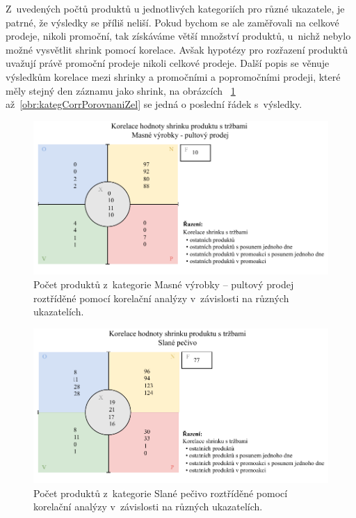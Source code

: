Z~uvedených počtů produktů u jednotlivých kategoriích pro různé ukazatele, je patrné, že výsledky se příliš neliší. Pokud bychom se ale zaměřovali na celkové prodeje, nikoli promoční, tak získáváme větší množství produktů, u~nichž nebylo možné vysvětlit shrink pomocí korelace. Avšak hypotézy pro rozřazení produktů uvažují právě promoční prodeje nikoli celkové prodeje. Další popis se věnuje výsledkům korelace mezi shrinky a promočními a popromočními prodeji, které měly stejný den záznamu jako shrink, na obrázcích ~\ref*{obr:kategCorrPorovnani} až~\ref*{obr:kategCorrPorovnaniZel} se jedná o poslední řádek s~výsledky.

\begin{figure}[h!]
    \centering
    \captionsetup{justification=centering}
    \includegraphics[width=\textwidth]{obrazky/kor_maso.pdf}
    \caption{Počet produktů z~kategorie Masné výrobky -- pultový prodej roztříděné pomocí korelační analýzy v~závislosti na různých ukazatelích.}
    \label{obr:kategCorrPorovnani}
\end{figure}

\begin{figure}[h!]
    \centering
    \captionsetup{justification=centering}
    \includegraphics[width=\textwidth]{obrazky/kor_pec.pdf}
    \caption{Počet produktů z~kategorie Slané pečivo roztříděné pomocí korelační analýzy v~závislosti na různých ukazatelích.}
    \label{obr:kategCorrPorovnaniPec}
\end{figure}

